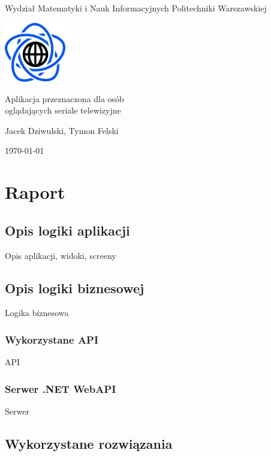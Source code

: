 \documentclass[10pt,a4paper]{article}
\begin{document}
\begin{titlepage}
	\centering
	{\Large Wydział Matematyki i Nauk Informacyjnych Politechniki Warszawskiej \par}
	\vspace{1cm}
	\includegraphics[width=0.2\textwidth]{Resources/Images/logo.png} \par
	\vspace{5cm}
	{\LARGE Aplikacja przeznaczona dla osób\\oglądających seriale telewizyjne \par}
	\vspace{0.5cm}
	{\Large Jacek Dziwulski, Tymon Felski \par}
	\vspace{1.5cm}
	{\Large \today \par}
\end{titlepage}

\newpage
\tableofcontents

\newpage
\section{Raport}

\subsection{Opis logiki aplikacji}
Opis aplikacji, widoki, screeny

\subsection{Opis logiki biznesowej}
Logika biznesowa

\subsubsection{Wykorzystane API}
API

\subsubsection{Serwer .NET WebAPI}
Serwer

\subsection{Wykorzystane rozwiązania}
\end{document}
